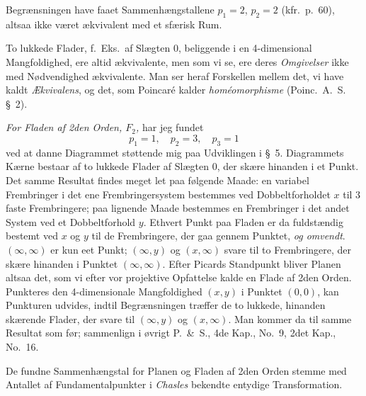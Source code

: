 \documentclass{article}
\begin{document}
Begrænsningen have faaet Sammenhængstallene $p_1 = 2$, $p_2 = 2$ (kfr.\ p.\ 60), altsaa ikke været ækvivalent med et sfærisk Rum.

To lukkede Flader, f.\ Eks.\ af Slægten 0, beliggende i en 4-dimensional Mangfoldighed, ere altid ækvivalente, men som vi se, ere deres \emph{Omgivelser} ikke med Nødvendighed ækvivalente. Man ser heraf Forskellen mellem det, vi have kaldt \emph{Ækvivalens}, og det, som Poincaré kalder \emph{homéomorphisme} (Poinc.\ A.~S. \S~2).

\emph{For Fladen af 2den Orden, $F_2$,} har jeg fundet
\[
p_1 = 1, \quad p_2 = 3, \quad p_3 = 1
\]
ved at danne Diagrammet støttende mig paa Udviklingen i \S~5. Diagrammets Kærne bestaar af to lukkede Flader af Slægten 0, der skære hinanden i et Punkt. Det samme Resultat findes meget let paa følgende Maade: en variabel Frembringer i det ene Frembringersystem bestemmes ved Dobbeltforholdet $x$ til 3 faste Frembringere; paa lignende Maade bestemmes en Frembringer i det andet System ved et Dobbeltforhold $y$. Ethvert Punkt paa Fladen er da fuldstændig bestemt ved $x$ og $y$ til de Frembringere, der gaa gennem Punktet, \emph{og omvendt}. $(\infty, \infty)$ er kun eet Punkt; $(\infty, y)$ og $(x, \infty)$ svare til to Frembringere, der skære hinanden i Punktet $(\infty, \infty)$. Efter Picards Standpunkt bliver Planen altsaa det, som vi efter vor projektive Opfattelse kalde en Flade af 2den Orden. Punkteres den 4-dimensionale Mangfoldighed $(x, y)$ i Punktet $(0, 0)$, kan Punkturen udvides, indtil Begrænsningen træffer de to lukkede, hinanden skærende Flader, der svare til $(\infty, y)$ og $(x, \infty)$. Man kommer da til samme Resultat som før; sammenlign i øvrigt P.~\&~S., 4de Kap., No.~9, 2det Kap., No.~16.

De fundne Sammenhængstal for Planen og Fladen af 2den Orden stemme med Antallet af Fundamentalpunkter i \emph{Chasles} bekendte entydige Transformation.
\end{document}
